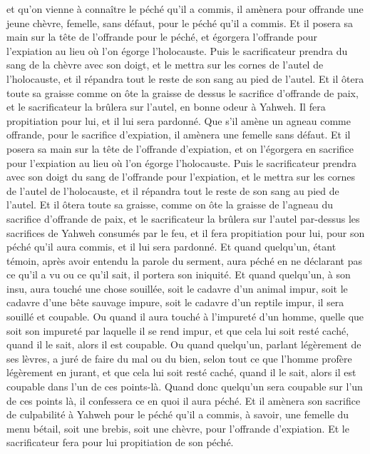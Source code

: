 \begin{multicols}{2}
et qu'on vienne à connaître le péché qu'il a commis, il amènera pour offrande une jeune chèvre, femelle, sans défaut, pour le péché qu'il a commis.
Et il posera sa main sur la tête de l'offrande pour le péché, et égorgera l'offrande pour l'expiation au lieu où l'on égorge l'holocauste.
Puis le sacrificateur prendra du sang de la chèvre avec son doigt, et le mettra sur les cornes de l'autel de l'holocauste, et il répandra tout le reste de son sang au pied de l'autel.
Et il ôtera toute sa graisse comme on ôte la graisse de dessus le sacrifice d'offrande de paix, et le sacrificateur la brûlera sur l'autel, en bonne odeur à Yahweh. Il fera propitiation pour lui, et il lui sera pardonné.
Que s'il amène un agneau comme offrande, pour le sacrifice d'expiation, il amènera une femelle sans défaut.
Et il posera sa main sur la tête de l'offrande d'expiation, et on l'égorgera en sacrifice pour l'expiation au lieu où l'on égorge l'holocauste.
Puis le sacrificateur prendra avec son doigt du sang de l'offrande pour l'expiation, et le mettra sur les cornes de l'autel de l'holocauste, et il répandra tout le reste de son sang au pied de l'autel.
Et il ôtera toute sa graisse, comme on ôte la graisse de l'agneau du sacrifice d'offrande de paix, et le sacrificateur la brûlera sur l'autel par-dessus les sacrifices de Yahweh consumés par le feu, et il fera propitiation pour lui, pour son péché qu'il aura commis, et il lui sera pardonné.
\VerseOne{}Et quand quelqu'un, étant témoin, après avoir entendu la parole du serment, aura péché en ne déclarant pas ce qu'il a vu ou ce qu'il sait, il portera son iniquité.
Et quand quelqu'un, à son insu, aura touché une chose souillée, soit le cadavre d'un animal impur, soit le cadavre d'une bête sauvage impure, soit le cadavre d'un reptile impur, il sera souillé et coupable.
Ou quand il aura touché à l'impureté d'un homme, quelle que soit son impureté par laquelle il se rend impur, et que cela lui soit resté caché, quand il le sait, alors il est coupable.
Ou quand quelqu'un, parlant légèrement de ses lèvres, a juré de faire du mal ou du bien, selon tout ce que l'homme profère légèrement en jurant, et que cela lui soit resté caché, quand il le sait, alors il est coupable dans l'un de ces points-là.
Quand donc quelqu'un sera coupable sur l'un de ces points là, il confessera ce en quoi il aura péché.
Et il amènera son sacrifice de culpabilité à Yahweh pour le péché qu'il a commis, à savoir, une femelle du menu bétail, soit une brebis, soit une chèvre, pour l'offrande d'expiation. Et le sacrificateur fera pour lui propitiation de son péché.

\end{multicols}
